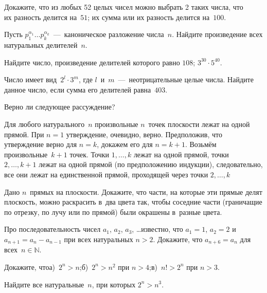 \documentclass[a4paper,12pt]{article}
\begin{document}
Докажите, что из любых 52 целых чисел можно выбрать 2 таких числа, что\\
 их разность делится на~$51$;
 их сумма или их разность делится на~$100$.

Пусть $p_1^{\alpha_1}\ldots p_k^{\alpha_k}$~---~каноническое разложение числа~$n$. %
Найдите произведение всех натуральных делителей~$n$.

Найдите число, произведение делителей которого равно
 $108$;
 $3^{30}\cdot5^{40}$.

Число имеет вид~$2^l\cdot3^m$, где $l$~и~$m$~---~неотрицательные целые числа.
Найдите данное число, если сумма его делителей равна~$403$.


Верно ли следующее рассуждение?\par
{} Для любого натурального~$n$ произвольные $n$~точек плоскости лежат на одной прямой. При $n=1$ утверждение, очевидно, верно. Предположив, что утверждение верно для $n=k$,
докажем его для $n=k+1$. Возьмём произвольные~$k+1$ точек. Точки $1,\ldots, k$ лежат
на одной прямой, точки $2,\ldots, k+1$ лежат на одной прямой (по предположению индукции), следовательно, все они лежат на единственной прямой, проходящей через точки $2,\ldots, k$

Дано $n$~прямых на плоскости. Докажите, что части, на которые эти прямые делят плоскость, можно раскрасить в~два цвета так, чтобы соседние части (граничащие по отрезку, по лучу или по прямой) были окрашены в~разные цвета.

Про последовательность чисел $a_1$, $a_2$, $a_3$, \dots известно, что $a_1=1$, $a_2=2$ и~$a_{n+1}=a_n-a_{n-1}$ при всех натуральных $n>2$. Докажите, что $a_{n+6}=a_n$ для всех~$n\in\mathbb N$.

Докажите, что\quad а)~$2^n>n$;\qquad б)~$2^n>n^2$ при $n>4$;\qquad в)~$n!>2^n$ при $n>3$.

Найдите все натуральные~$n$, при которых $2^n>n^3$.
\end{document}
